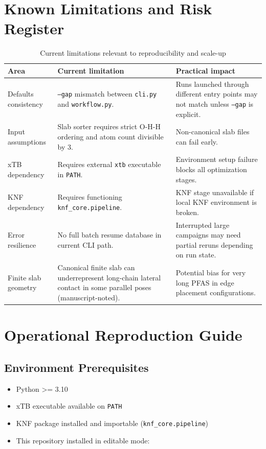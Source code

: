 ﻿\documentclass[11pt]{article}
\begin{document}
\section{Known Limitations and Risk Register}
\begin{table}[H]
\centering
\caption{Current limitations relevant to reproducibility and scale-up}
\begin{tabular}{p{}p{}p{}}
\toprule
Area & Current limitation & Practical impact \\
\midrule
Defaults consistency & \texttt{--gap} mismatch between \texttt{cli.py} and \texttt{workflow.py}. & Runs launched through different entry points may not match unless \texttt{--gap} is explicit. \\
Input assumptions & Slab sorter requires strict O-H-H ordering and atom count divisible by 3. & Non-canonical slab files can fail early. \\
xTB dependency & Requires external \texttt{xtb} executable in \texttt{PATH}. & Environment setup failure blocks all optimization stages. \\
KNF dependency & Requires functioning \texttt{knf\_core.pipeline}. & KNF stage unavailable if local KNF environment is broken. \\
Error resilience & No full batch resume database in current CLI path. & Interrupted large campaigns may need partial reruns depending on run state. \\
Finite slab geometry & Canonical finite slab can underrepresent long-chain lateral contact in some parallel poses (manuscript-noted). & Potential bias for very long PFAS in edge placement configurations. \\
\bottomrule
\end{tabular}
\end{table}

\section{Operational Reproduction Guide}
\subsection{Environment Prerequisites}
\begin{itemize}[leftmargin=1.5em]
\item Python >= 3.10
\item xTB executable available on \texttt{PATH}
\item KNF package installed and importable (\texttt{knf\_core.pipeline})
\item This repository installed in editable mode:
\end{itemize}
\end{document}
